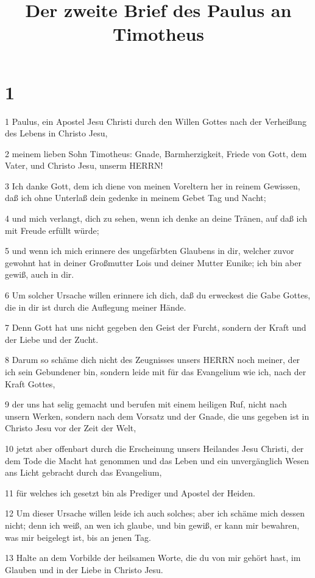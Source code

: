 

\title{Der zweite Brief des Paulus an Timotheus}


\chapter{1}

\par 1 Paulus, ein Apostel Jesu Christi durch den Willen Gottes nach der Verheißung des Lebens in Christo Jesu,
\par 2 meinem lieben Sohn Timotheus: Gnade, Barmherzigkeit, Friede von Gott, dem Vater, und Christo Jesu, unserm HERRN!
\par 3 Ich danke Gott, dem ich diene von meinen Voreltern her in reinem Gewissen, daß ich ohne Unterlaß dein gedenke in meinem Gebet Tag und Nacht;
\par 4 und mich verlangt, dich zu sehen, wenn ich denke an deine Tränen, auf daß ich mit Freude erfüllt würde;
\par 5 und wenn ich mich erinnere des ungefärbten Glaubens in dir, welcher zuvor gewohnt hat in deiner Großmutter Lois und deiner Mutter Eunike; ich bin aber gewiß, auch in dir.
\par 6 Um solcher Ursache willen erinnere ich dich, daß du erweckest die Gabe Gottes, die in dir ist durch die Auflegung meiner Hände.
\par 7 Denn Gott hat uns nicht gegeben den Geist der Furcht, sondern der Kraft und der Liebe und der Zucht.
\par 8 Darum so schäme dich nicht des Zeugnisses unsers HERRN noch meiner, der ich sein Gebundener bin, sondern leide mit für das Evangelium wie ich, nach der Kraft Gottes,
\par 9 der uns hat selig gemacht und berufen mit einem heiligen Ruf, nicht nach unsern Werken, sondern nach dem Vorsatz und der Gnade, die uns gegeben ist in Christo Jesu vor der Zeit der Welt,
\par 10 jetzt aber offenbart durch die Erscheinung unsers Heilandes Jesu Christi, der dem Tode die Macht hat genommen und das Leben und ein unvergänglich Wesen ans Licht gebracht durch das Evangelium,
\par 11 für welches ich gesetzt bin als Prediger und Apostel der Heiden.
\par 12 Um dieser Ursache willen leide ich auch solches; aber ich schäme mich dessen nicht; denn ich weiß, an wen ich glaube, und bin gewiß, er kann mir bewahren, was mir beigelegt ist, bis an jenen Tag.
\par 13 Halte an dem Vorbilde der heilsamen Worte, die du von mir gehört hast, im Glauben und in der Liebe in Christo Jesu.
